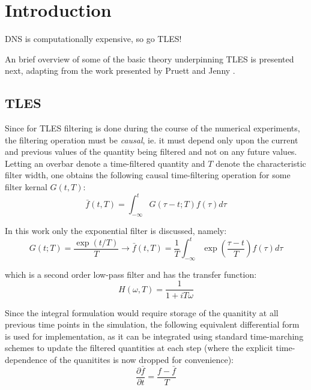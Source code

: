 \chapter{Introduction}


DNS is computationally expensive, so go TLES!

An brief overview of some of the basic theory underpinning TLES is presented next, adapting from the work presented by Pruett \cite{Pruett2008} and Jenny \cite{Jenny2016}.

\section{TLES}

Since for TLES filtering is done during the course of the numerical experiments, the filtering operation must be \emph{causal}, ie. it must depend only upon the current and previous values of the quantity being filtered and not on any future values. Letting an overbar denote a time-filtered quantity and $T$ denote the characteristic filter width, one obtains the following causal time-filtering operation for some filter kernal $G(t,T)$:
\begin{equation}
\bar{f}(t,T)=\int_{-\infty}^{t}G(\tau -t;T)f(\tau)d\tau
\end{equation}

In this work only the exponential filter is discussed, namely:
\begin{equation}
G(t;T)=\frac{\exp(t/T)}{T} \longrightarrow \bar{f}(t,T)=\frac{1}{T}\int_{-\infty}^{t}\exp\left(\frac{\tau-t}{T}\right)f(\tau)d\tau
\end{equation}

which is a second order low-pass filter and has the transfer function:
\begin{equation}
H(\omega,T)=\frac{1}{1+iT\omega}
\end{equation}

Since the integral formulation would require storage of the quanitity at all previous time points in the simulation, the following equivalent differential form is used for implementation, as it can be integrated using standard time-marching schemes to update the filtered quantities at each step (where the explicit time-dependence of the quanitites is now dropped for convenience):
\begin{equation} \label{filter_diff}
\frac{\partial \bar{f}}{\partial t}=\frac{f-\bar{f}}{T}
\end{equation}

